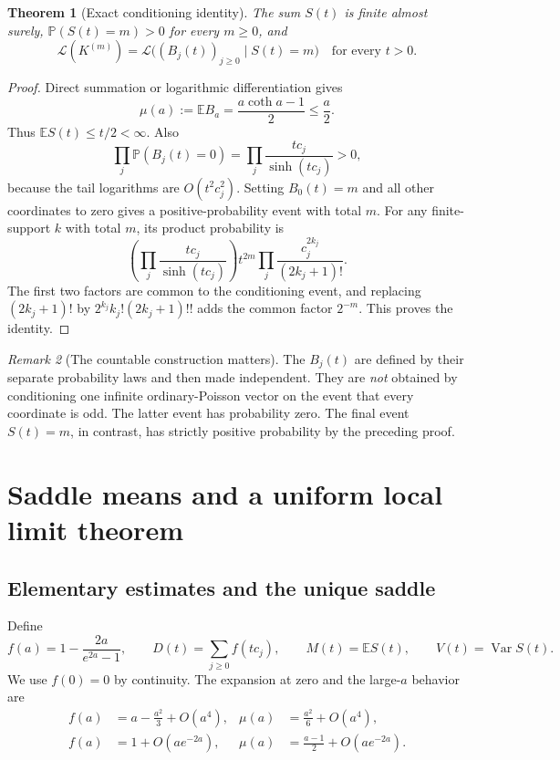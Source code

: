 \documentclass[11pt,a4paper]{article}
\numberwithin{equation}{section}
\newtheorem{theorem}{Theorem}[section]
\theoremstyle{definition}
\theoremstyle{remark}
\newtheorem{remark}[theorem]{Remark}
\newcommand{\E}{\mathbb E}
\newcommand{\PP}{\mathbb P}
\newcommand{\Var}{\operatorname{Var}}
\newcommand{\Law}{\mathcal L}
\begin{document}
\begin{theorem}[Exact conditioning identity]
\label{thm:conditioning}
The sum $S(t)$ is finite almost surely, $\PP(S(t)=m)>0$ for every
$m\ge0$, and
\begin{equation}
\Law(K^{(m)})
=\Law\bigl((B_j(t))_{j\ge0}\mid S(t)=m\bigr)
\quad\text{for every }t>0.
\label{eq:conditioning}
\end{equation}
\end{theorem}
\begin{proof}
Direct summation or logarithmic differentiation gives
\begin{equation}
\mu(a):=\E B_a=\frac{a\coth a-1}{2}\le\frac a2.
\label{eq:single-mean}
\end{equation}
Thus $\E S(t)\le t/2<\infty$. Also
\[
\prod_j\PP(B_j(t)=0)=\prod_j\frac{tc_j}{\sinh(tc_j)}>0,
\]
because the tail logarithms are $O(t^2c_j^2)$. Setting $B_0(t)=m$ and all
other coordinates to zero gives a positive-probability event with total
$m$. For any finite-support $k$ with total $m$, its product probability is
\[
\left(\prod_j\frac{tc_j}{\sinh(tc_j)}\right)
t^{2m}\prod_j\frac{c_j^{2k_j}}{(2k_j+1)!}.
\]
The first two factors are common to the conditioning event, and replacing
$(2k_j+1)!$ by $2^{k_j}k_j!(2k_j+1)!!$ adds the common factor $2^{-m}$.
This proves the identity.
\end{proof}

\begin{remark}[The countable construction matters]
The $B_j(t)$ are defined by their separate probability laws and then made
independent. They are \emph{not} obtained by conditioning one infinite
ordinary-Poisson vector on the event that every coordinate is odd. The latter
event has probability zero. The final event $S(t)=m$, in contrast, has
strictly positive probability by the preceding proof.
\end{remark}

\section{Saddle means and a uniform local limit theorem}
\label{sec:llt}

\subsection{Elementary estimates and the unique saddle}
Define
\begin{equation}
f(a)=1-\frac{2a}{e^{2a}-1},\qquad
D(t)=\sum_{j\ge0}f(tc_j),\qquad
M(t)=\E S(t),\qquad V(t)=\Var S(t).
\label{eq:deficit}
\end{equation}
We use $f(0)=0$ by continuity. The expansion at zero and the large-$a$
behavior are
\begin{align}
f(a)&=a-\frac{a^2}{3}+O(a^4),
&\mu(a)&=\frac{a^2}{6}+O(a^4), \label{eq:small-a}\\
f(a)&=1+O(ae^{-2a}),
&\mu(a)&=\frac{a-1}{2}+O(ae^{-2a}).\label{eq:large-a}
\end{align}
\end{document}
